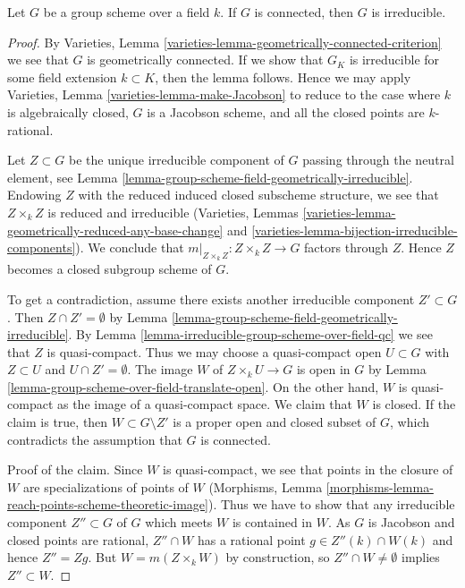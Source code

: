 \begin{lemma}
\label{lemma-connected-group-scheme-over-field-irreducible}
Let $G$ be a group scheme over a field $k$. If $G$ is connected,
then $G$ is irreducible.
\end{lemma}

\begin{proof}
By Varieties, Lemma \ref{varieties-lemma-geometrically-connected-criterion}
we see that $G$ is geometrically connected. If we show that $G_K$
is irreducible for some field extension $k \subset K$, then
the lemma follows. Hence we may apply
Varieties, Lemma \ref{varieties-lemma-make-Jacobson}
to reduce to the case where $k$ is algebraically closed,
$G$ is a Jacobson scheme, and all the closed points are $k$-rational.

\medskip\noindent
Let $Z \subset G$ be the unique irreducible component of $G$ passing
through the neutral element, see
Lemma \ref{lemma-group-scheme-field-geometrically-irreducible}.
Endowing $Z$ with the reduced induced closed subscheme structure,
we see that $Z \times_k Z$ is reduced and irreducible
(Varieties, Lemmas
\ref{varieties-lemma-geometrically-reduced-any-base-change} and
\ref{varieties-lemma-bijection-irreducible-components}).
We conclude that $m|_{Z \times_k Z} : Z \times_k Z \to G$ factors
through $Z$. Hence $Z$ becomes a closed subgroup scheme of $G$.

\medskip\noindent
To get a contradiction, assume there exists another irreducible
component $Z' \subset G$. Then $Z \cap Z' = \emptyset$ by
Lemma \ref{lemma-group-scheme-field-geometrically-irreducible}.
By Lemma \ref{lemma-irreducible-group-scheme-over-field-qc}
we see that $Z$ is quasi-compact. Thus we may choose a quasi-compact open
$U \subset G$ with $Z \subset U$ and $U \cap Z' = \emptyset$.
The image $W$ of $Z \times_k U \to G$ is open in $G$ by
Lemma \ref{lemma-group-scheme-over-field-translate-open}.
On the other hand, $W$ is quasi-compact as the image of a
quasi-compact space. We claim that $W$ is closed.
If the claim is true, then $W \subset G \setminus Z'$ is a proper open
and closed subset of $G$, which contradicts the assumption that
$G$ is connected.

\medskip\noindent
Proof of the claim. Since $W$ is quasi-compact, we see that
points in the closure of $W$ are specializations of points of $W$
(Morphisms, Lemma \ref{morphisms-lemma-reach-points-scheme-theoretic-image}).
Thus we have to show that any irreducible
component $Z'' \subset G$ of $G$ which meets $W$ is contained in $W$.
As $G$ is Jacobson and closed points are rational,
$Z'' \cap W$ has a rational point
$g \in Z''(k) \cap W(k)$ and hence $Z'' = Zg$. But $W = m(Z \times_k W)$
by construction, so $Z'' \cap W \not = \emptyset$ implies
$Z'' \subset W$.
\end{proof}

